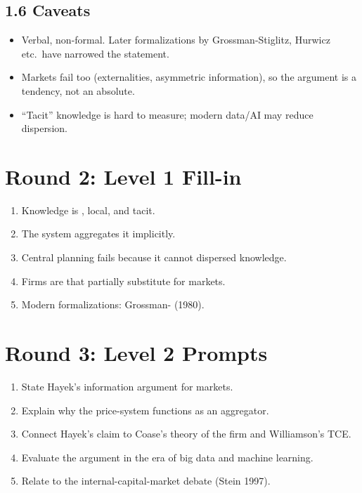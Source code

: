 \documentclass[11pt]{article}
\newcommand{\blank}[1]{\underline{\hspace{#1}}}
\begin{document}
\subsection*{1.6 Caveats}
\begin{alertbox}
\begin{itemize}
\item Verbal, non-formal. Later formalizations by Grossman-Stiglitz, Hurwicz etc.\ have narrowed the statement.
\item Markets fail too (externalities, asymmetric information), so the argument is a tendency, not an absolute.
\item ``Tacit'' knowledge is hard to measure; modern data/AI may reduce dispersion.
\end{itemize}
\end{alertbox}

\section*{Round 2: Level 1 Fill-in}
\begin{enumerate}
\item Knowledge is \blank{2cm}, local, and tacit.
\item The \blank{2cm} system aggregates it implicitly.
\item Central planning fails because it cannot \blank{2cm} dispersed knowledge.
\item Firms are \blank{2cm} that partially substitute for markets.
\item Modern formalizations: Grossman-\blank{2cm} (1980).
\end{enumerate}

\section*{Round 3: Level 2 Prompts}
\begin{enumerate}
\item State Hayek's information argument for markets.
\item Explain why the price-system functions as an aggregator.
\item Connect Hayek's claim to Coase's theory of the firm and Williamson's TCE.
\item Evaluate the argument in the era of big data and machine learning.
\item Relate to the internal-capital-market debate (Stein 1997).
\end{enumerate}
\end{document}
